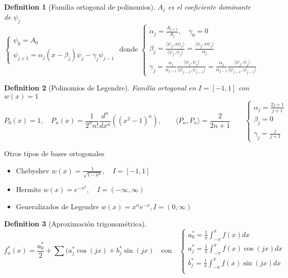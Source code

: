 \documentclass[leqno]{article}
\newtheorem*{definition}{Definition}
\begin{document}
\begin{definition}[Familia ortogonal de polinomios] $A_j$ es el coeficiente dominante de  $\psi _j$
\[
\begin{cases}
  \psi _0 = A_0\\
  \psi _{j+1}=\alpha _j(x-\beta _j)\psi _j - \gamma_j\psi _{j-1}
\end{cases} \text{ donde }
\begin{cases}
  \alpha _j = \frac{A_{j+1}}{A_j}, \quad \gamma_0 = 0 \\
  \beta _j = \frac{\langle \psi _j, x\psi _j \rangle }{\langle \psi _j, \psi _j \rangle } = \frac{\langle \psi _j, x\psi _j \rangle }{\alpha _j}\\
  \gamma _j = \frac{\alpha _j}{\alpha _{j-1}} \frac{\langle \psi _j, \psi _j \rangle }{\langle \psi _{j-1}, \psi _{j-1} \rangle } = \frac{\alpha _j}{\alpha _{j-1}} \frac{ \langle  \psi _j, \psi _j \rangle}{\langle \psi _{j-1}, \psi _{j-1}\rangle} 
\end{cases}
\] 
\end{definition}

\begin{definition}[Polinomios de Legendre] Familia ortogonal en $I = [-1,1]$ con  $w(x)=1$
\[
P_0(x) = 1, \quad P_n(x) = \frac{1}{2^nn!} \frac{d^n}{d x^n} ((x^2-1)^n), \qquad \langle P_n, P_n \rangle = \frac{2}{2n+1}  \qquad
\begin{cases}
  \alpha _j = \frac{2j+1}{j+1}\\
  \beta _j = 0\\
  \gamma_j = \frac{j}{j+1}
\end{cases}
\] 
\end{definition}

Otros tipos de bases ortogonales
\begin{itemize}[topsep=-6pt, itemsep=0pt]
  \item Chebyshev $w(x)=\frac{1}{\sqrt{1-x^2} }, \quad I = [-1, 1]$
  \item Hermite $w(x) = e^{-x^2}, \quad I = (-\infty , \infty)$
  \item Generalizados de Legendre $w(x) = x^\alpha e^{-x}, I = (0, \infty)$
\end{itemize}

\begin{definition}[Aproximación trigonométrica]
\[
f^*_n(x ) = \frac{a^*_{0}}{2} + \sum (a_j^*\cos(jx) + b_j^*\sin(jx) \quad \text{con} \quad
\begin{cases}
  a^*_0 = \frac{1}{\pi}\int_{-\pi}^\pi f(x)dx\\
  a^*_j = \frac{1}{\pi}\int_{-\pi}^\pi f(x)\cos(jx)dx\\
  b^*_j = \frac{1}{\pi}\int_{-\pi}^\pi f(x)\sin(jx)dx\\
\end{cases}
\] 
\end{definition}
\end{document}

